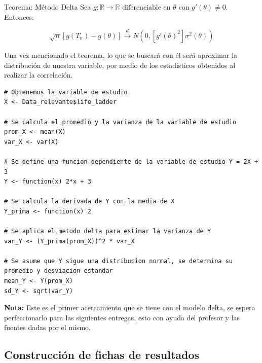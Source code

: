 \begin{enumerate}
\begin{mybox}{Teorema: Método Delta}
        Sea $g: \mathbb{R} \longrightarrow \mathbb{R} \text{ diferenciable en } \theta \text{ con } g'(\theta) \neq 0$. 
        Entonces: 

        \begin{equation*}
            \sqrt{n}[g(T_n) - g(\theta)] \xrightarrow[]{d} N(0, [g'(\theta)^2]\sigma^2(\theta))
        \end{equation*}

        \flushright\cite{asymptotic_stats}
    \end{mybox}

    Una vez mencionado el teorema, lo que se buscará con él será aproximar la distribución de nuestra variable, por medio de los estadísticos obtenidos al realizar la correlación. 
\pagebreak

\begin{lstlisting}[caption={Estimación de la distribución utilizando el método delta}, label=lst:rchunk2 ] 
# Obtenemos la variable de estudio
X <- Data_relevante$life_ladder

# Se calcula el promedio y la varianza de la variable de estudio
prom_X <- mean(X)
var_X <- var(X)

# Se define una funcion dependiente de la variable de estudio Y = 2X + 3
Y <- function(x) 2*x + 3

# Se calcula la derivada de Y con la media de X
Y_prima <- function(x) 2

# Se aplica el metodo delta para estimar la varianza de Y
var_Y <- (Y_prima(prom_X))^2 * var_X

# Se asume que Y sigue una distribucion normal, se determina su promedio y desviacion estandar
mean_Y <- Y(prom_X)
sd_Y <- sqrt(var_Y)
\end{lstlisting}

\end{enumerate}

\textbf{Nota:} Este es el primer acercamiento que se tiene con el modelo delta, se espera perfeccionarlo para las siguientes entregas, esto con ayuda del profesor y las fuentes dadas por el mismo.
\newpage

\subsection{Construcción de fichas de resultados}

